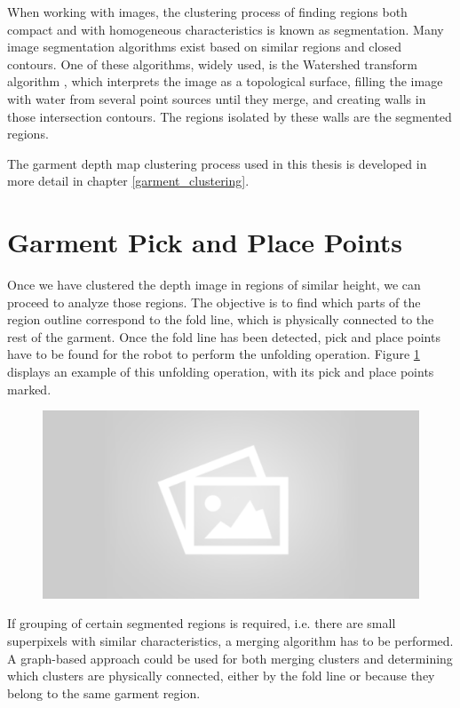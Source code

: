 When working with images, the clustering process of finding regions both compact and with homogeneous characteristics is known as segmentation. Many image segmentation algorithms exist based on similar regions and closed contours. One of these algorithms, widely used, is the Watershed transform algorithm , which interprets the image as a topological surface, filling the image with water from several point sources until they merge, and creating walls in those intersection contours. The regions isolated by these walls are the segmented regions.

The garment depth map clustering process used in this thesis is developed in more detail in chapter \ref{garment_clustering}.

\section{Garment Pick and Place Points}
\label{garment_PnP_points}

Once we have clustered the depth image in regions of similar height, we can proceed to analyze those regions. The objective is to find which parts of the region outline correspond to the fold line, which is physically connected to the rest of the garment. Once the fold line has been detected, pick and place points have to be found for the robot to perform the unfolding operation. Figure \ref{fig:picking_points} displays an example of this unfolding operation, with its pick and place points marked.

\begin{figure}[thpb]
    \centering
    \includegraphics[width=0.8
    \textwidth]{figures/placeholder2.png}
    \caption{}
    \label{fig:picking_points}
\end{figure}


If grouping of certain segmented regions is required, i.e. there are small superpixels with similar characteristics, a merging algorithm has to be performed. A graph-based approach could be used for both merging clusters and determining which clusters are physically connected, either by the fold line or because they belong to the same garment region.


